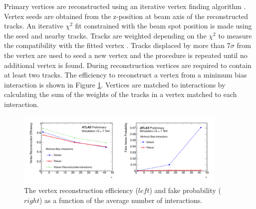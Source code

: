 Primary vertices are reconstructed using an iterative vertex finding algorithm \cite{Vrtx_Eff}. Vertex seeds are obtained from the z-position at beam axis of the reconstructed tracks. An iterative $\chi^2$ fit constrained with the beam spot position is made using the seed and nearby tracks. Tracks are weighted depending on the $\chi^2$ to measure the compatibility with the fitted vertex \cite{chi2}. Tracks displaced by more than 7$\sigma$ from the vertex are used to seed a new vertex and the procedure is repeated until no additional vertex is found. During reconstruction vertices are required to contain at least two tracks. The efficiency to reconstruct a vertex from a minimum bias interaction is shown in Figure \ref{fig:chap2:Objects:Vtx:Eff}. Vertices  are matched to interactions by calculating the sum of the weights of the tracks in a vertex matched to each interaction. 
\begin{figure}[ht]
    \centering
    \includegraphics[width=0.9\textwidth]{Ch2/Img/Vtx_Reco_Eff.png}
    \caption{The vertex reconstruction efficiency ($left$) and fake probability ($right$) as a function of the average number of interactions.}
    \label{fig:chap2:Objects:Vtx:Eff}
\end{figure}

